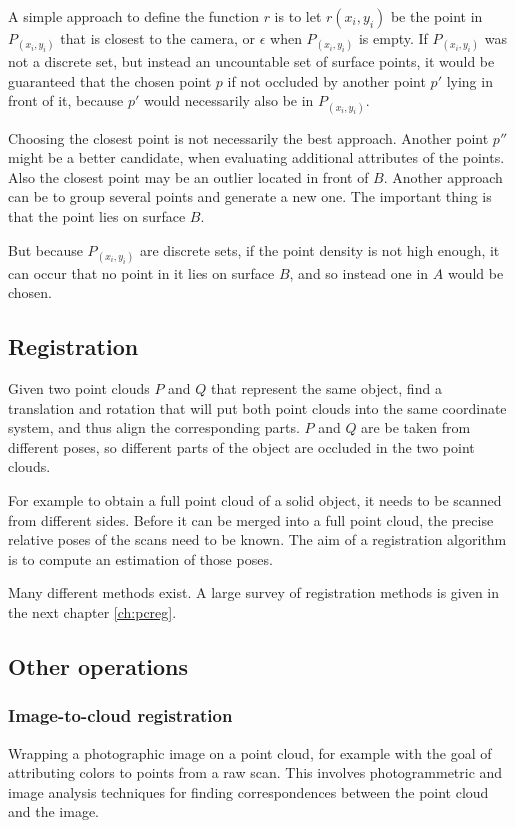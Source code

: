 A simple approach to define the function $r$ is to let $r(x_i, y_i)$ be the point in $P_{(x_i,y_i)}$ that is closest to the camera, or $\epsilon$ when $P_{(x_i,y_i)}$ is empty. If $P_{(x_i,y_i)}$ was not a discrete set, but instead an uncountable set of surface points, it would be guaranteed that the chosen point $p$ if not occluded by another point $p'$ lying in front of it, because $p'$ would necessarily also be in $P_{(x_i,y_i)}$.

Choosing the closest point is not necessarily the best approach. Another point $p''$ might be a better candidate, when evaluating additional attributes of the points. Also the closest point may be an outlier located in front of $B$. Another approach can be to group several points and generate a new one. The important thing is that the point lies on surface $B$.

But because $P_{(x_i,y_i)}$ are discrete sets, if the point density is not high enough, it can occur that no point in it lies on surface $B$, and so instead one in $A$ would be chosen.



\subsection{Registration} \label{sec:pc_registration}
Given two point clouds $P$ and $Q$ that represent the same object, find a translation and rotation that will put both point clouds into the same coordinate system, and thus align the corresponding parts. $P$ and $Q$ are be taken from different poses, so different parts of the object are occluded in the two point clouds.

For example to obtain a full point cloud of a solid object, it needs to be scanned from different sides. Before it can be merged into a full point cloud, the precise relative poses of the scans need to be known. The aim of a registration algorithm is to compute an estimation of those poses.

Many different methods exist. A large survey of registration methods is given in the next chapter \ref{ch:pcreg}.



\subsection{Other operations}

\subsubsection{Image-to-cloud registration}
Wrapping a photographic image on a point cloud, for example with the goal of attributing colors to points from a raw scan. This involves photogrammetric and image analysis techniques for finding correspondences between the point cloud and the image.


